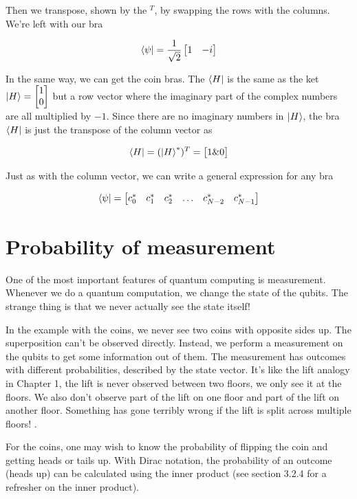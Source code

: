 \documentclass{book}
\begin{document}
Then we transpose, shown by the $^T$, by swapping the rows with the columns. We're left with our bra

$$\bra{\psi} = \frac{1}{\sqrt{2}} \begin{bmatrix} 1 & -i \end{bmatrix} $$


In the same way, we can get the coin bras. The $\bra{H}$ is the same as the ket $\ket{H} = \begin{bmatrix} 1 \\ 0 \end{bmatrix}$ but a row vector where the imaginary part of the complex numbers are all multiplied by $-1$. Since there are no imaginary numbers in $\ket{H}$, the bra $\bra{H}$ is just the transpose of the column vector as

$$
\bra{H} = (\ket{H}^*)^T = \begin{bmatrix} 1 \& 0 \end{bmatrix}
$$

Just as with the column vector, we can write a general expression for any bra

$$
\bra{\psi} = \begin{bmatrix} c_0^* & c_1^* & c_2^* & \dots & c_{N-2}^* & c_{N-1}^* \end{bmatrix}
$$

\section{ Probability of measurement}


One of the most important features of quantum computing is measurement. Whenever we do a quantum computation, we change the state of the qubits. The strange thing is that we never actually see the state itself! 

In the example with the coins, we never see two coins with opposite sides up. The superposition can't be observed directly. Instead, we perform a measurement on the qubits to get some information out of them. The measurement has outcomes with different probabilities, described by the state vector. It's like the lift analogy in Chapter 1, the lift is never observed between two floors, we only see it at the floors. We also don't observe part of the lift on one floor and part of the lift on another floor. Something has gone terribly wrong if the lift is split across multiple floors! 
. 

For the coins, one may wish to know the probability of flipping the coin and getting heads or tails up. With Dirac notation, the probability of an outcome (heads up) can be calculated using the inner product (see section 3.2.4 for a refresher on the inner product).
\end{document}

